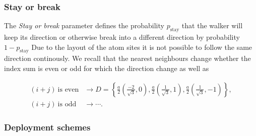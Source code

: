 \begin{figure}[H]
     \label{fig:bias_prob}
\end{figure}


\subsubsection{Stay or break}
The \textit{Stay or break} parameter defines the probability $p_{\text{stay}}$ that the walker will keep its direction or otherwise break into a different direction by probability $1-p_{\text{stay}}$ Due to the layout of the atom sites it is not possible to follow the same direction continously. We recall that the nearest neighbours change whether the index sum is even or odd for which the direction change as well as

\begin{align*}
  (i + j) \ \text{is even} &\rightarrow D = \left\{ \frac{a}{2}\left(\frac{-2}{\sqrt{3}}, 0\right), \frac{a}{2}\left(\frac{1}{\sqrt{3}}, 1\right), \frac{a}{2}\left(\frac{1}{\sqrt{3}}, -1\right)\right\}, \\
  (i + j) \ \text{is odd} &\rightarrow \cdots .
\end{align*}



\subsubsection{Deployment schemes}





